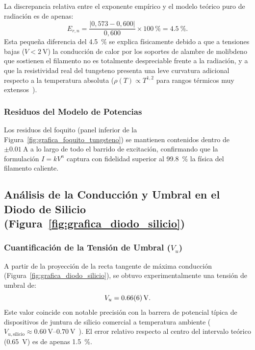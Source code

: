 La discrepancia relativa entre el exponente empírico y el modelo teórico puro de radiación es de apenas:
\begin{equation}
    E_{r,n} = \frac{|0{,}573 - 0{,}600|}{0{,}600} \times \qty{100}{\percent} = \qty{4,5}{\percent}.
\end{equation}
Esta pequeña diferencia del \qty{4,5}{\percent} se explica físicamente debido a que a tensiones bajas ($V < \qty{2}{\volt}$) la conducción de calor por los soportes de alambre de molibdeno que sostienen el filamento no es totalmente despreciable frente a la radiación, y a que la resistividad real del tungsteno presenta una leve curvatura adicional respecto a la temperatura absoluta ($\rho(T) \propto T^{1{,}2}$ para rangos térmicos muy extensos~\cite{serway}).

\subsubsection{Residuos del Modelo de Potencias}
Los residuos del foquito (panel inferior de la Figura~\ref{fig:grafica_foquito_tungsteno}) se mantienen contenidos dentro de $\pm\qty{0,01}{\ampere}$ a lo largo de todo el barrido de excitación, confirmando que la formulación $I = k V^n$ captura con fidelidad superior al \qty{99,8}{\percent} la física del filamento caliente.

\subsection{Análisis de la Conducción y Umbral en el Diodo de Silicio (Figura~\ref{fig:grafica_diodo_silicio})}
\subsubsection{Cuantificación de la Tensión de Umbral (\texorpdfstring{$V_u$}{Vu})}
A partir de la proyección de la recta tangente de máxima conducción (Figura~\ref{fig:grafica_diodo_silicio}), se obtuvo experimentalmente una tensión de umbral de:
\begin{equation}
    V_u = \qty{0,66 \pm 0,06}{\volt}.
\end{equation}
Este valor coincide con notable precisión con la barrera de potencial típica de dispositivos de juntura de silicio comercial a temperatura ambiente ($V_{u,\text{silicio}} \approx \qtyrange{0,60}{0,70}{\volt}$~\cite{boylestad}). El error relativo respecto al centro del intervalo teórico (\qty{0,65}{\volt}) es de apenas \qty{1,5}{\percent}.

